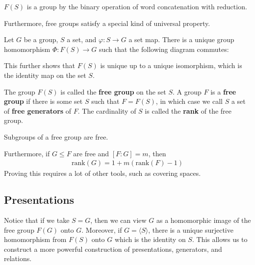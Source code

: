 \documentclass{memoir}
\begin{document}
\begin{thm}
	\(F(S)\) is a group by the binary operation of word concatenation with reduction.
\end{thm}
Furthermore, free groups satisfy a special kind of universal property.
\begin{thm}
	Let \(G\) be a group, \(S\) a set, and \(\varphi :S\to G\) a set map. There is a unique group homomorphism \(\Phi :F(S) \to G\) such that the following diagram commutes:
\begin{center}
\end{center}

\end{thm}
This further shows that \(F(S)\) is unique up to a unique isomorphism, which is the identity map on the set \(S\).

\begin{defn}
	The group \(F(S)\) is called the \textbf{free group} on the set \(S\). A group \(F\) is a \textbf{free group} if there is some set \(S\) such that \(F = F(S)\), in which case we call \(S\) a set of \textbf{free generators} of \(F\). The cardinality of \(S\) is called the \textbf{rank} of the free group.
\end{defn}

\begin{thm}
	Subgroups of a free group are free.
\end{thm}
Furthermore, if \(G\leq F\) are free and \([F:G] = m\), then
\begin{align*}
	\textrm{rank}(G) = 1 + m(\textrm{rank}(F)-1)
\end{align*}
Proving this requires a lot of other tools, such as covering spaces.

\subsection{Presentations}
\label{sub:presentations}

Notice that if we take \(S = G\), then we can view \(G\) as a homomorphic image of the free group \(F(G)\) onto \(G\). Moreover, if \(G= \langle S \rangle \), there is a unique surjective homomorphism from  \(F(S)\) onto \(G\) which is the identity on \(S\). This allows us to construct a more powerful construction of presentations, generators, and relations.
\end{document}
